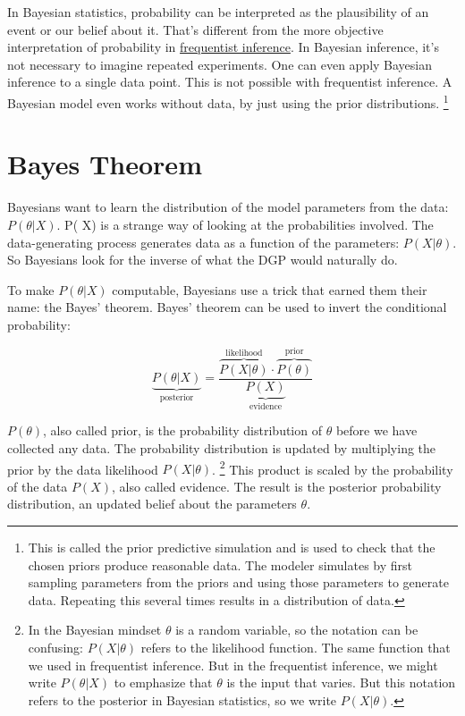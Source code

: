 \documentclass[
  10pt,
]{scrbook}
\begin{document}
In Bayesian statistics, probability can be interpreted as the plausibility of an event or our belief about it.
That's different from the more objective interpretation of probability in \protect\hyperlink{frequentist-inference}{frequentist inference}.
In Bayesian inference, it's not necessary to imagine repeated experiments.
One can even apply Bayesian inference to a single data point.
This is not possible with frequentist inference.
A Bayesian model even works without data, by just using the prior distributions. \footnote{This is called the prior predictive simulation and is used to check that the chosen priors produce reasonable data. The modeler simulates by first sampling parameters from the priors and using those parameters to generate data. Repeating this several times results in a distribution of data.}

\hypertarget{bayes-theorem}{%
\section{Bayes Theorem}\label{bayes-theorem}}

Bayesians want to learn the distribution of the model parameters from the data: \(P(\theta | X)\).
P(\theta \textbar{} X) is a strange way of looking at the probabilities involved.
The data-generating process generates data as a function of the parameters: \(P(X | \theta)\).
So Bayesians look for the inverse of what the DGP would naturally do.

To make \(P(\theta|X)\) computable, Bayesians use a trick that earned them their name: the Bayes' theorem.
Bayes' theorem can be used to invert the conditional probability:

\[\underbrace{P(\theta|X)}_{\text{posterior}} = \frac{\overbrace{P(X | \theta)}^{\text{likelihood}} \cdot  \overbrace{P(\theta)}^{\text{prior}}}{\underbrace{P(X)}_{\text{evidence}}}\]

\(P(\theta)\), also called prior, is the probability distribution of \(\theta\) before we have collected any data.
The probability distribution is updated by multiplying the prior by the data likelihood \(P(X | \theta)\). \footnote{In the Bayesian mindset \(\theta\) is a random variable, so the notation can be confusing: \(P(X | \theta)\) refers to the likelihood function. The same function that we used in frequentist inference. But in the frequentist inference, we might write \(P(\theta | X)\) to emphasize that \(\theta\) is the input that varies. But this notation refers to the posterior in Bayesian statistics, so we write \(P(X | \theta)\).}
This product is scaled by the probability of the data \(P(X)\), also called evidence.
The result is the posterior probability distribution, an updated belief about the parameters \(\theta\).
\end{document}
